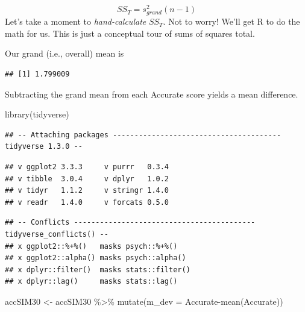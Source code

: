 \documentclass[
  english,
]{book}
\newenvironment{Shaded}{\begin{snugshade}}{\end{snugshade}}
\newcommand{\AttributeTok}[1]{\textcolor[rgb]{0.77,0.63,0.00}{#1}}
\newcommand{\FunctionTok}[1]{\textcolor[rgb]{0.00,0.00,0.00}{#1}}
\newcommand{\NormalTok}[1]{#1}
\newcommand{\OtherTok}[1]{\textcolor[rgb]{0.56,0.35,0.01}{#1}}
\newcommand{\SpecialCharTok}[1]{\textcolor[rgb]{0.00,0.00,0.00}{#1}}
\begin{document}
\[SS_{T}= s_{grand}^{2}(n-1)\]
Let's take a moment to \emph{hand-calculate} \(SS_{T}\). Not to worry! We'll get R to do the math for us. This is just a conceptual tour of sums of squares total.

Our grand (i.e., overall) mean is

\begin{Shaded}
\end{Shaded}

\begin{verbatim}
## [1] 1.799009
\end{verbatim}

Subtracting the grand mean from each Accurate score yields a mean difference.

\begin{Shaded}
\begin{Highlighting}[]
\FunctionTok{library}\NormalTok{(tidyverse)}
\end{Highlighting}
\end{Shaded}

\begin{verbatim}
## -- Attaching packages --------------------------------------- tidyverse 1.3.0 --
\end{verbatim}

\begin{verbatim}
## v ggplot2 3.3.3     v purrr   0.3.4
## v tibble  3.0.4     v dplyr   1.0.2
## v tidyr   1.1.2     v stringr 1.4.0
## v readr   1.4.0     v forcats 0.5.0
\end{verbatim}

\begin{verbatim}
## -- Conflicts ------------------------------------------ tidyverse_conflicts() --
## x ggplot2::%+%()   masks psych::%+%()
## x ggplot2::alpha() masks psych::alpha()
## x dplyr::filter()  masks stats::filter()
## x dplyr::lag()     masks stats::lag()
\end{verbatim}

\begin{Shaded}
\begin{Highlighting}[]
\NormalTok{accSIM30 }\OtherTok{\textless{}{-}}\NormalTok{ accSIM30 }\SpecialCharTok{\%\textgreater{}\%} 
  \FunctionTok{mutate}\NormalTok{(}\AttributeTok{m\_dev =}\NormalTok{ Accurate}\SpecialCharTok{{-}}\FunctionTok{mean}\NormalTok{(Accurate))}
\end{Highlighting}
\end{Shaded}
\end{document}
